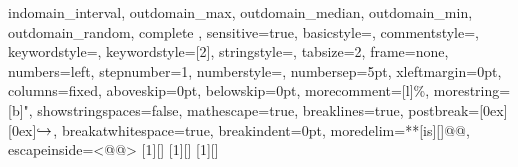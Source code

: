{{  indomain_interval, outdomain_max, outdomain_median, outdomain_min,
  outdomain_random, complete
  },
  sensitive=true,
  basicstyle=\mznfont,
  commentstyle=\color[rgb]{0.9,0.1,0.1},
  keywordstyle=\color[rgb]{0,0.5,0},
  keywordstyle=[2]\color{blue},
  stringstyle=\color{orange},
  tabsize=2,
  frame=none,
  numbers=left,
  stepnumber=1,
  numberstyle=\tiny,
  numbersep=5pt,
  xleftmargin=0pt, %
  columns=fixed, %
  aboveskip={0pt},
  belowskip={0pt},
  morecomment=[l]{\%},
  morestring=[b]",
  showstringspaces=false,
  mathescape=true,
  breaklines=true,
  postbreak=\raisebox{0ex}[0ex][0ex]{\ensuremath{\textcolor{black}{\hookrightarrow\space}}},%
  breakatwhitespace=true,
  breakindent=0pt, %
  moredelim=**[is][\color{Melon}]{@}{@},
  escapeinside={{<@}{@>}}
}
[1][]{\lstset{language=Mzn,#1}}{}
[1][]{\lstset{language=Mzn,numbers=none,xleftmargin=0pt,#1}}{}
[1][]{\noindent\lstset{language=Mzn,numbers=none,xleftmargin=0pt,#1}\minipage{\textwidth}}{\endminipage}
\newcommand{\mzninline}[1]{\lstinline[{language=Mzn}]|#1|}
\newcommand{\mzninlinebar}[1]{\lstinline[{language=Mzn}]!#1!}
